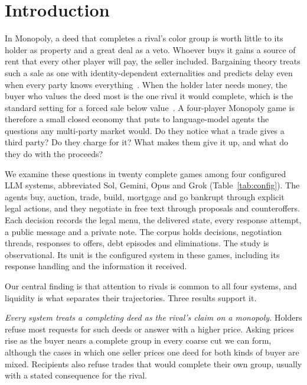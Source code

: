 \section{Introduction}

In Monopoly, a deed that completes a rival's color group is worth little to its holder as property and a great deal as a veto. Whoever buys it gains a source of rent that every other player will pay, the seller included. Bargaining theory treats such a sale as one with identity-dependent externalities and predicts delay even when every party knows everything~\cite{jehiel1995delay}. When the holder later needs money, the buyer who values the deed most is the one rival it would complete, which is the standard setting for a forced sale below value~\cite{shleifer1992liquidation}. A four-player Monopoly game is therefore a small closed economy that puts to language-model agents the questions any multi-party market would. Do they notice what a trade gives a third party? Do they charge for it? What makes them give it up, and what do they do with the proceeds?

We examine these questions in twenty complete games among four configured LLM systems, abbreviated Sol, Gemini, Opus and Grok (Table~\ref{tab:config}). The agents buy, auction, trade, build, mortgage and go bankrupt through explicit legal actions, and they negotiate in free text through proposals and counteroffers. Each decision records the legal menu, the delivered state, every response attempt, a public message and a private note. The corpus holds  decisions,  negotiation threads,  responses to offers,  debt episodes and  eliminations. The study is observational. Its unit is the configured system in these games, including its response handling and the information it received.

Our central finding is that attention to rivals is common to all four systems, and liquidity is what separates their trajectories. Three results support it.

\emph{Every system treats a completing deed as the rival's claim on a monopoly.} Holders refuse most requests for such deeds or answer with a higher price. Asking prices rise as the buyer nears a complete group in every coarse cut we can form, although the  cases in which one seller prices one deed for both kinds of buyer are mixed. Recipients also refuse trades that would complete their own group, usually with a stated consequence for the rival.

